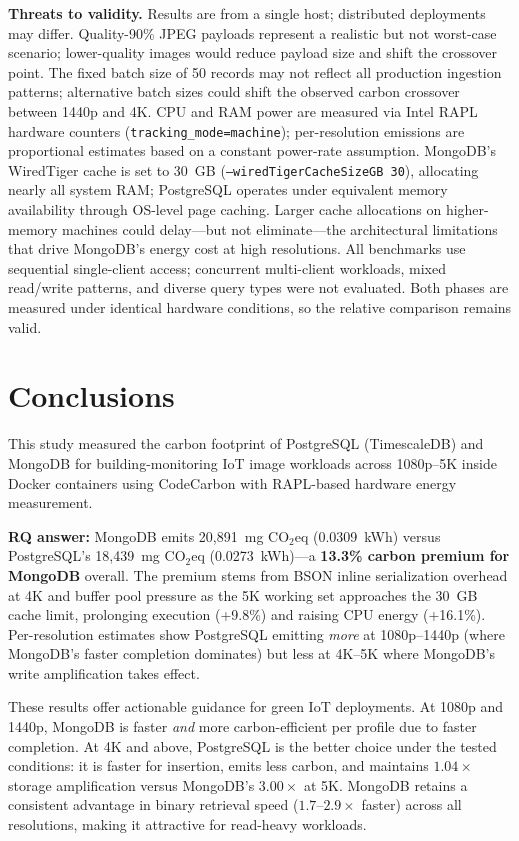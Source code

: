 \documentclass[conference]{IEEEtran}
\begin{document}
\textbf{Threats to validity.} Results are from a single host; distributed deployments may differ. Quality-90\% JPEG payloads represent a realistic but not worst-case scenario; lower-quality images would reduce payload size and shift the crossover point. The fixed batch size of 50 records may not reflect all production ingestion patterns; alternative batch sizes could shift the observed carbon crossover between 1440p and 4K. CPU and RAM power are measured via Intel RAPL hardware counters (\texttt{tracking\_mode=machine}); per-resolution emissions are proportional estimates based on a constant power-rate assumption. MongoDB's WiredTiger cache is set to 30~GB (\texttt{--wiredTigerCacheSizeGB~30}), allocating nearly all system RAM; PostgreSQL operates under equivalent memory availability through OS-level page caching. Larger cache allocations on higher-memory machines could delay---but not eliminate---the architectural limitations that drive MongoDB's energy cost at high resolutions. All benchmarks use sequential single-client access; concurrent multi-client workloads, mixed read/write patterns, and diverse query types were not evaluated. Both phases are measured under identical hardware conditions, so the relative comparison remains valid.

\section{Conclusions}
\label{sec:conclusions}

This study measured the carbon footprint of PostgreSQL (TimescaleDB) and MongoDB for building-monitoring IoT image workloads across 1080p--5K inside Docker containers using CodeCarbon with RAPL-based hardware energy measurement.

\textbf{RQ answer:} MongoDB emits 20,891~mg CO$_2$eq (0.0309~kWh) versus PostgreSQL's 18,439~mg CO$_2$eq (0.0273~kWh)---a \textbf{13.3\% carbon premium for MongoDB} overall. The premium stems from BSON inline serialization overhead at 4K and buffer pool pressure as the 5K working set approaches the 30~GB cache limit, prolonging execution (+9.8\%) and raising CPU energy (+16.1\%). Per-resolution estimates show PostgreSQL emitting \emph{more} at 1080p--1440p (where MongoDB's faster completion dominates) but less at 4K--5K where MongoDB's write amplification takes effect.

These results offer actionable guidance for green IoT deployments. At 1080p and 1440p, MongoDB is faster \emph{and} more carbon-efficient per profile due to faster completion. At 4K and above, PostgreSQL is the better choice under the tested conditions: it is faster for insertion, emits less carbon, and maintains $1.04\times$ storage amplification versus MongoDB's $3.00\times$ at 5K. MongoDB retains a consistent advantage in binary retrieval speed ($1.7$--$2.9\times$ faster) across all resolutions, making it attractive for read-heavy workloads.
\end{document}
